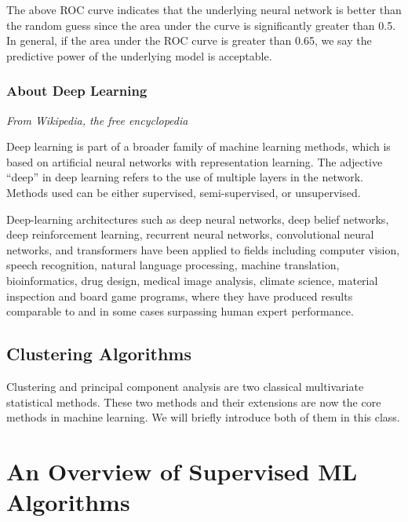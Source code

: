 \documentclass[
]{book}
\begin{document}
The above ROC curve indicates that the underlying neural network is better than the random guess since the area under the curve is significantly greater than 0.5. In general, if the area under the ROC curve is greater than 0.65, we say the predictive power of the underlying model is acceptable.

\hfill\break

\hypertarget{about-deep-learning}{%
\subsection{About Deep Learning}\label{about-deep-learning}}

\emph{From Wikipedia, the free encyclopedia}

Deep learning is part of a broader family of machine learning methods, which is based on artificial neural networks with representation learning. The adjective ``deep'' in deep learning refers to the use of multiple layers in the network. Methods used can be either supervised, semi-supervised, or unsupervised.

Deep-learning architectures such as deep neural networks, deep belief networks, deep reinforcement learning, recurrent neural networks, convolutional neural networks, and transformers have been applied to fields including computer vision, speech recognition, natural language processing, machine translation, bioinformatics, drug design, medical image analysis, climate science, material inspection and board game programs, where they have produced results comparable to and in some cases surpassing human expert performance.

\hfill\break

\hypertarget{clustering-algorithms}{%
\section{Clustering Algorithms}\label{clustering-algorithms}}

Clustering and principal component analysis are two classical multivariate statistical methods. These two methods and their extensions are now the core methods in machine learning. We will briefly introduce both of them in this class.

\hfill\break

\hypertarget{an-overview-of-supervised-ml-algorithms}{%
\chapter{An Overview of Supervised ML Algorithms}\label{an-overview-of-supervised-ml-algorithms}}
\end{document}

